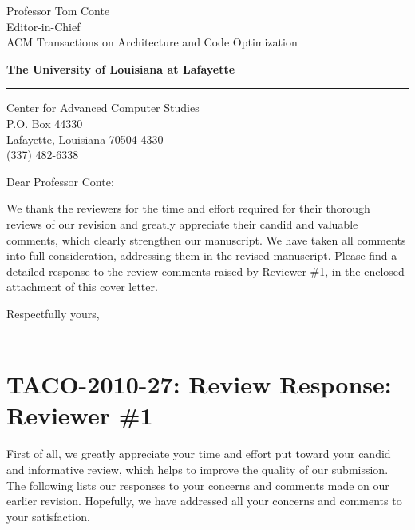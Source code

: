 \documentclass[10pt]{letter} %
\begin{document}
\longindentation=0pt                       %
\let\raggedleft\raggedright                %
 
 
\begin{letter}{Professor Tom Conte \\
Editor-in-Chief \\
ACM Transactions on Architecture and Code Optimization }


\begin{flushright}
{\hfill \large\bf The University of Louisiana at Lafayette}
\end{flushright}
\medskip\hrule height 1pt
\begin{flushright}
\hfill Center for Advanced Computer Studies\\
\hfill P.O. Box 44330 \\
\hfill Lafayette, Louisiana 70504-4330\\
\hfill (337) 482-6338 \\
\hfill {}
\end{flushright} 

 
\opening{Dear Professor Conte:} 
 
\noindent We thank the reviewers for the time and effort required for
their thorough reviews of our revision and greatly appreciate their
candid and valuable comments, which clearly strengthen our manuscript.
We have taken all comments into full consideration, addressing them in
the revised manuscript.  Please find a detailed
response to the review comments raised by Reviewer \#1, in the enclosed
attachment of this cover letter.
 
\closing{Respectfully yours, \\
 \\
}

\clearpage
\section{TACO-2010-27: Review Response: Reviewer \#1}
\label{sec-1}
First of all, we greatly appreciate your time and effort put toward
your candid and informative review, which helps to improve the quality
of our submission.  The following lists our responses to your concerns
and comments made on our earlier revision.  Hopefully, we have addressed
all your concerns and comments to your satisfaction.


\end{letter}
\end{document}
